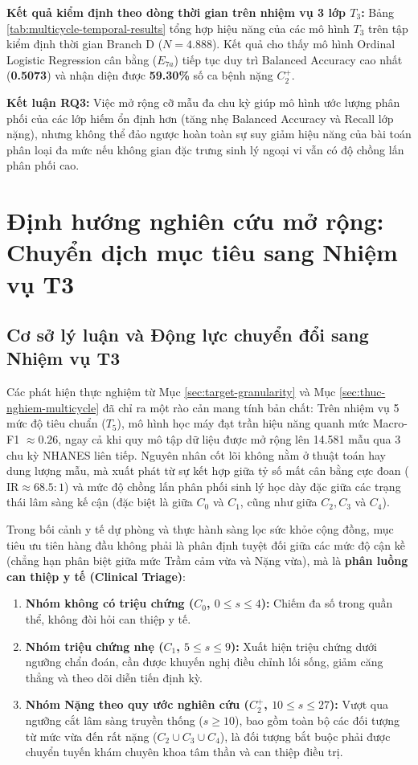 \textbf{Kết quả kiểm định theo dòng thời gian trên nhiệm vụ 3 lớp $T_3$:}  
Bảng \ref{tab:multicycle-temporal-results} tổng hợp hiệu năng của các mô hình $T_3$ trên tập kiểm định thời gian Branch D ($N = 4.888$). Kết quả cho thấy mô hình Ordinal Logistic Regression cân bằng ($E_{7a}$) tiếp tục duy trì Balanced Accuracy cao nhất (\textbf{0.5073}) và nhận diện được \textbf{59.30\%} số ca bệnh nặng $C_2^+$.



\textbf{Kết luận RQ3:} Việc mở rộng cỡ mẫu đa chu kỳ giúp mô hình ước lượng phân phối của các lớp hiếm ổn định hơn (tăng nhẹ Balanced Accuracy và Recall lớp nặng), nhưng không thể đảo ngược hoàn toàn sự suy giảm hiệu năng của bài toán phân loại đa mức nếu không gian đặc trưng sinh lý ngoại vi vẫn có độ chồng lấn phân phối cao.

\FloatBarrier
\section{Định hướng nghiên cứu mở rộng: Chuyển dịch mục tiêu sang Nhiệm vụ T3}
\label{sec:dinh-huong-t3}

\subsection{Cơ sở lý luận và Động lực chuyển đổi sang Nhiệm vụ T3}
Các phát hiện thực nghiệm từ Mục \ref{sec:target-granularity} và Mục \ref{sec:thuc-nghiem-multicycle} đã chỉ ra một rào cản mang tính bản chất: Trên nhiệm vụ 5 mức độ tiêu chuẩn ($T_5$), mô hình học máy đạt trần hiệu năng quanh mức Macro-F1 $\approx 0.26$, ngay cả khi quy mô tập dữ liệu được mở rộng lên 14.581 mẫu qua 3 chu kỳ NHANES liên tiếp. Nguyên nhân cốt lõi không nằm ở thuật toán hay dung lượng mẫu, mà xuất phát từ sự kết hợp giữa tỷ số mất cân bằng cực đoan ($\text{IR} \approx 68.5:1$) và mức độ chồng lấn phân phối sinh lý học dày đặc giữa các trạng thái lâm sàng kế cận (đặc biệt là giữa $C_0$ và $C_1$, cũng như giữa $C_2, C_3$ và $C_4$).

Trong bối cảnh y tế dự phòng và thực hành sàng lọc sức khỏe cộng đồng, mục tiêu ưu tiên hàng đầu không phải là phân định tuyệt đối giữa các mức độ cận kề (chẳng hạn phân biệt giữa mức Trầm cảm vừa và Nặng vừa), mà là \textbf{phân luồng can thiệp y tế (Clinical Triage)}:
\begin{enumerate}
    \item \textbf{Nhóm không có triệu chứng ($C_0$, $0 \le s \le 4$):} Chiếm đa số trong quần thể, không đòi hỏi can thiệp y tế.
    \item \textbf{Nhóm triệu chứng nhẹ ($C_1$, $5 \le s \le 9$):} Xuất hiện triệu chứng dưới ngưỡng chẩn đoán, cần được khuyến nghị điều chỉnh lối sống, giảm căng thẳng và theo dõi diễn tiến định kỳ.
    \item \textbf{Nhóm Nặng theo quy ước nghiên cứu ($C_2^+$, $10 \le s \le 27$):} Vượt qua ngưỡng cắt lâm sàng truyền thống ($s \ge 10$), bao gồm toàn bộ các đối tượng từ mức vừa đến rất nặng ($C_2 \cup C_3 \cup C_4$), là đối tượng bắt buộc phải được chuyển tuyến khám chuyên khoa tâm thần và can thiệp điều trị.
\end{enumerate}

